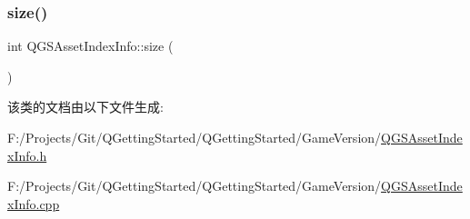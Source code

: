 \mbox{\label{class_q_g_s_asset_index_info_a56e04f0b73d47448736a542c122ebbf7}} 
\subsubsection{\texorpdfstring{size()}{size()}}
{\footnotesize\ttfamily int Q\+G\+S\+Asset\+Index\+Info\+::size (\begin{DoxyParamCaption}{ }\end{DoxyParamCaption})}



该类的文档由以下文件生成\+:\begin{DoxyCompactItemize}
\item 
F\+:/\+Projects/\+Git/\+Q\+Getting\+Started/\+Q\+Getting\+Started/\+Game\+Version/\mbox{\hyperlink{_q_g_s_asset_index_info_8h}{Q\+G\+S\+Asset\+Index\+Info.\+h}}\item 
F\+:/\+Projects/\+Git/\+Q\+Getting\+Started/\+Q\+Getting\+Started/\+Game\+Version/\mbox{\hyperlink{_q_g_s_asset_index_info_8cpp}{Q\+G\+S\+Asset\+Index\+Info.\+cpp}}\end{DoxyCompactItemize}
